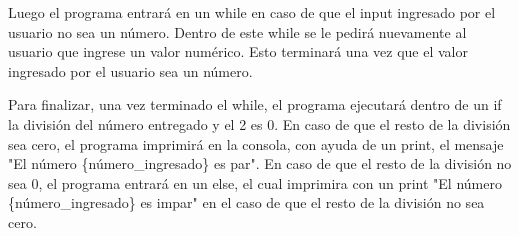 \documentclass{article}
\begin{document}
\noindent Luego el programa entrará en un while en caso de que el input ingresado por el usuario no sea un número. Dentro de este while se le pedirá nuevamente al usuario que ingrese un valor numérico. Esto terminará una vez que el valor ingresado por el usuario sea un número.

\vspace{10pt}

\noindent Para finalizar, una vez terminado el while, el programa ejecutará dentro de un if la división del número entregado y el 2 es 0. En caso de que el resto de la división sea cero, el programa imprimirá en la consola, con ayuda de un print, el mensaje "El número \{número\_ingresado\} es par". En caso de que el resto de la división no sea 0, el programa entrará en un else, el cual imprimira con un print "El número \{número\_ingresado\} es impar" en el caso de que el resto de la división no sea cero.
\end{document}
